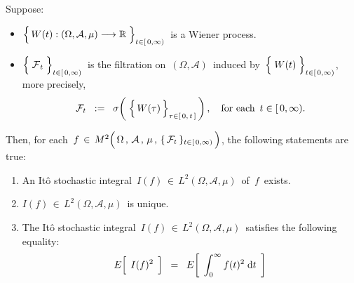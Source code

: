 
\vskip 0.5cm
\begin{theorem}
\mbox{}
\vskip 0.2cm
\noindent
Suppose:
\begin{itemize}
\item
	$\left\{\,\overset{{\color{white}.}}{W}(t) : (\Omega,\mathcal{A},\mu) \longrightarrow \Re \;\right\}_{t \in[\,0,\infty)}$\,
	is a Wiener process.
\item
	$\left\{\;\overset{{\color{white}.}}{\mathcal{F}}_{t}\;\right\}_{t\in[\,0,\infty)}$\,
	is the filtration on \,$(\Omega,\mathcal{A})$\, induced by
	\,$\left\{\;\overset{{\color{white}.}}{W}(t)\;\right\}_{t\in[\,0,\infty)}$,\,
	more precisely,
	\begin{equation*}
	\mathcal{F}_{t}
	\;\; := \;\;
		\sigma\!\left(\;\left\{\,\overset{{\color{white}.}}{W}(\tau)\,\right\}_{\tau\in[\,0,\,t\,]}\,\right),
	\quad
	\textnormal{for each \,$t \in [\,0,\infty)$}.
	\end{equation*}
\end{itemize}
Then, for each 
\,$f \,\in\, M^{2}\!
	\left(\,
		\overset{{\color{white}.}}{\Omega} \,,\, \mathcal{A} \,,\, \mu \,,\, \{\,\mathcal{F}_{t}\,\}_{t \in [\,0,\infty)}
		\,\right)$,
the following statements are true:
\begin{enumerate}
\item
	An It\^{o} stochastic integral \,$I(f) \,\in\, L^{2}(\Omega,\mathcal{A},\mu)$\, of \,$f$\, exists.
\item
	$I(f) \,\in\, L^{2}(\Omega,\mathcal{A},\mu)$\, is unique.
\item
	The It\^{o} stochastic integral \,$I(f) \,\in\, L^{2}(\Omega,\mathcal{A},\mu)$\, satisfies the following equality:
	\begin{equation*}
	E\!\left[\;\, \overset{{\color{white}.}}{I(f)^{2}} \,\;\right]
	\;\; = \;\;
		E\!\left[\;\,
			\int_{0}^{\infty} f(t)^{2} \;\d t
			\,\;\right]
	\end{equation*}
\end{enumerate}
\end{theorem}
\proof
